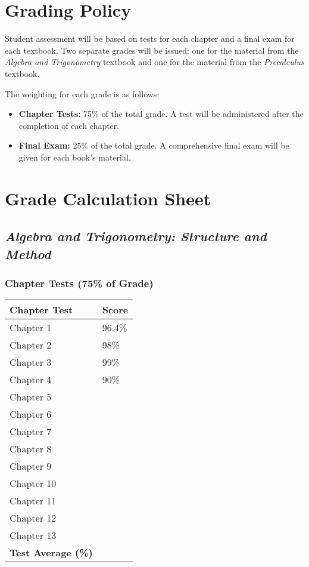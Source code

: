 \documentclass[11pt, letterpaper]{article}
\begin{document}
\section*{Grading Policy}
Student assessment will be based on tests for each chapter and a final exam for each textbook. Two separate grades will be issued: one for the material from the \textit{Algebra and Trigonometry} textbook and one for the material from the \textit{Precalculus} textbook.

The weighting for each grade is as follows:
\begin{itemize}
    \item \textbf{Chapter Tests:} 75\% of the total grade. A test will be administered after the completion of each chapter.
    \item \textbf{Final Exam:} 25\% of the total grade. A comprehensive final exam will be given for each book's material.
\end{itemize}

\newpage
\section*{Grade Calculation Sheet}

\subsection*{\textit{Algebra and Trigonometry: Structure and Method}}
\subsubsection*{Chapter Tests (75\% of Grade)}
\begin{tabular}{|p{6cm}|p{3cm}|}
\hline
\textbf{Chapter Test} & \textbf{Score} \\
\hline
Chapter 1 & 96.4\% \\ \hline
Chapter 2 & 98\% \\ \hline
Chapter 3 & 99\% \\ \hline
Chapter 4 & 90\% \\ \hline
Chapter 5 & \\ \hline
Chapter 6 & \\ \hline
Chapter 7 & \\ \hline
Chapter 8 & \\ \hline
Chapter 9 & \\ \hline
Chapter 10 & \\ \hline
Chapter 11 & \\ \hline
Chapter 12 & \\ \hline
Chapter 13 & \\ \hline
\textbf{Test Average (\%)} & \\
\hline
\end{tabular}
\end{document}
